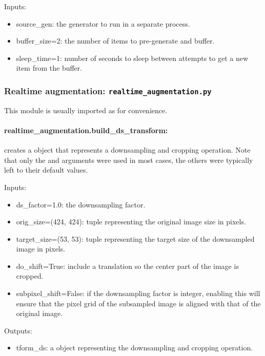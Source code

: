 \documentclass[a4paper,10pt]{article}
\begin{document}
Inputs:
 \begin{itemize}
  \item{source\_gen:} the generator to run in a separate process.
  \item{buffer\_size=2:} the number of items to pre-generate and buffer.
  \item{sleep\_time=1:} number of seconds to sleep between attempts to get a new item from the buffer.
 \end{itemize}
 
\subsubsection{Realtime augmentation: \texttt{realtime\_augmentation.py}}

This module is usually imported as  for convenience.

\paragraph{realtime\_augmentation.build\_ds\_transform:} creates a  object that represents a downsampling and cropping operation. Note that only the  and  arguments were used in most cases, the others were typically left to their default values.

Inputs:
 \begin{itemize}
  \item{ds\_factor=1.0:} the downsampling factor.
  \item{orig\_size=(424, 424):} tuple representing the original image size in pixels.
  \item{target\_size=(53, 53):} tuple representing the target size of the downsampled image in pixels.
  \item{do\_shift=True:} include a translation so the center part of the image is cropped.
  \item{subpixel\_shift=False:} if the downsampling factor is integer, enabling this will ensure that the pixel grid of the subsampled image is aligned with that of the original image.
 \end{itemize}
 
Outputs:
\begin{itemize}
 \item{tform\_ds:} a  object representing the downsampling and cropping operation.
\end{itemize}
\end{document}
